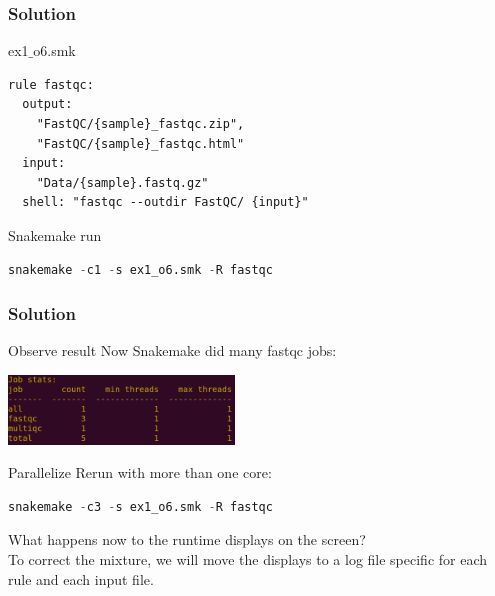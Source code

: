 \begin{frame}[containsverbatim]
\frametitle{Solution}
\begin{exampleblock}{ex1$\_$o6.smk}
\begin{lstlisting}
rule fastqc:
  output:
    "FastQC/{sample}_fastqc.zip",
    "FastQC/{sample}_fastqc.html"
  input:
    "Data/{sample}.fastq.gz"
  shell: "fastqc --outdir FastQC/ {input}"
\end{lstlisting}
\end{exampleblock}
\begin{exampleblock}{Snakemake run}
\begin{lstlisting}[language=python]
snakemake -c1 -s ex1_o6.smk -R fastqc
\end{lstlisting}
\end{exampleblock}
\end{frame}
\begin{frame}[containsverbatim]
\frametitle{Solution}
\begin{exampleblock}{Observe result}
Now Snakemake did many fastqc jobs:
\begin{center}
    \includegraphics[width=6cm]{03_workflow/images/FAIR_ex1_o6_smk.png}
\end{center}
\end{exampleblock}
\begin{exampleblock}{Parallelize}
Rerun with more than one core: 
\begin{lstlisting}[language=python]
snakemake -c3 -s ex1_o6.smk -R fastqc
\end{lstlisting}
What happens now to the runtime displays on the screen?\\

To correct the mixture, we will move the displays to a log file specific for each rule and each input file.
\end{exampleblock}
\end{frame}
